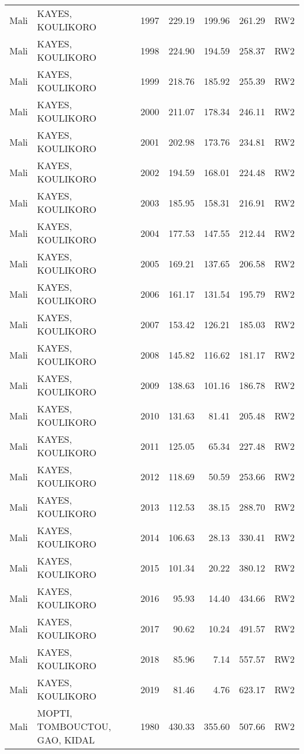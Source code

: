 \begin{longtable}{lllrrrl}
  Mali & KAYES, KOULIKORO & 1997 & 229.19 & 199.96 & 261.29 & RW2 \\ 
  Mali & KAYES, KOULIKORO & 1998 & 224.90 & 194.59 & 258.37 & RW2 \\ 
  Mali & KAYES, KOULIKORO & 1999 & 218.76 & 185.92 & 255.39 & RW2 \\ 
  Mali & KAYES, KOULIKORO & 2000 & 211.07 & 178.34 & 246.11 & RW2 \\ 
  Mali & KAYES, KOULIKORO & 2001 & 202.98 & 173.76 & 234.81 & RW2 \\ 
  Mali & KAYES, KOULIKORO & 2002 & 194.59 & 168.01 & 224.48 & RW2 \\ 
  Mali & KAYES, KOULIKORO & 2003 & 185.95 & 158.31 & 216.91 & RW2 \\ 
  Mali & KAYES, KOULIKORO & 2004 & 177.53 & 147.55 & 212.44 & RW2 \\ 
  Mali & KAYES, KOULIKORO & 2005 & 169.21 & 137.65 & 206.58 & RW2 \\ 
  Mali & KAYES, KOULIKORO & 2006 & 161.17 & 131.54 & 195.79 & RW2 \\ 
  Mali & KAYES, KOULIKORO & 2007 & 153.42 & 126.21 & 185.03 & RW2 \\ 
  Mali & KAYES, KOULIKORO & 2008 & 145.82 & 116.62 & 181.17 & RW2 \\ 
  Mali & KAYES, KOULIKORO & 2009 & 138.63 & 101.16 & 186.78 & RW2 \\ 
  Mali & KAYES, KOULIKORO & 2010 & 131.63 & 81.41 & 205.48 & RW2 \\ 
  Mali & KAYES, KOULIKORO & 2011 & 125.05 & 65.34 & 227.48 & RW2 \\ 
  Mali & KAYES, KOULIKORO & 2012 & 118.69 & 50.59 & 253.66 & RW2 \\ 
  Mali & KAYES, KOULIKORO & 2013 & 112.53 & 38.15 & 288.70 & RW2 \\ 
  Mali & KAYES, KOULIKORO & 2014 & 106.63 & 28.13 & 330.41 & RW2 \\ 
  Mali & KAYES, KOULIKORO & 2015 & 101.34 & 20.22 & 380.12 & RW2 \\ 
  Mali & KAYES, KOULIKORO & 2016 & 95.93 & 14.40 & 434.66 & RW2 \\ 
  Mali & KAYES, KOULIKORO & 2017 & 90.62 & 10.24 & 491.57 & RW2 \\ 
  Mali & KAYES, KOULIKORO & 2018 & 85.96 & 7.14 & 557.57 & RW2 \\ 
  Mali & KAYES, KOULIKORO & 2019 & 81.46 & 4.76 & 623.17 & RW2 \\ 
  Mali & MOPTI, TOMBOUCTOU, GAO, KIDAL & 1980 & 430.33 & 355.60 & 507.66 & RW2 \\ 

\end{longtable}
